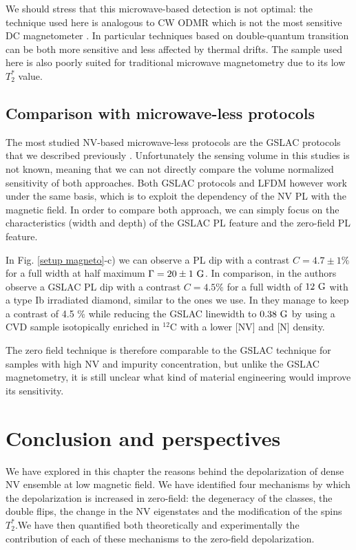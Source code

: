 \documentclass[a4paper, 11pt]{report}
\begin{document}
We should stress that this microwave-based detection is not optimal: the technique used here is analogous to CW ODMR which is not the most sensitive DC magnetometer \citep{barry2020sensitivity}. In particular techniques based on double-quantum transition can be both more sensitive and less affected by thermal drifts. The sample used here is also poorly suited for traditional microwave magnetometry due to its low $T_2^*$ value. 

\subsection{Comparison with microwave-less protocols}
The most studied NV-based microwave-less protocols are the GSLAC protocols that we described previously \citep{wickenbrock2016microwave, zheng2020microwave}. Unfortunately the sensing volume in this studies is not known, meaning that we can not directly compare the volume normalized sensitivity of both approaches. Both GSLAC protocols and LFDM however work under the same basis, which is to exploit the dependency of the NV PL with the magnetic field. In order to compare both approach, we can simply focus on the characteristics (width and depth) of the GSLAC PL feature and the zero-field PL feature.

In Fig. \ref{setup magneto}-c) we can observe a PL dip with a contrast $C=4.7\pm 1 \% $ for a full width at half maximum $\Gamma=20 \pm 1\ \rm G$. In comparison, in \citep{wickenbrock2016microwave} the authors observe a GSLAC PL dip with a contrast $C=4.5 \%$ for a full width of $12 \ \rm G$ with a type Ib irradiated diamond, similar to the ones we use. In \citep{zheng2020microwave} they manage to keep a contrast of 4.5 \% while reducing the GSLAC linewidth to $0.38\ \rm G$ by using a CVD sample isotopically enriched in $^{12}$C with a lower [NV] and [N] density.

The zero field technique is therefore comparable to the GSLAC technique for samples with high NV and impurity concentration, but unlike the GSLAC magnetometry, it is still unclear what kind of material engineering would improve its sensitivity.

\section{Conclusion and perspectives}
We have explored in this chapter the reasons behind the depolarization of dense NV ensemble at low magnetic field. We have identified four mechanisms by which the depolarization is increased in zero-field: the degeneracy of the classes, the double flips, the change in the NV eigenstates and the modification of the spins $T_2^*$.We have then quantified both theoretically and experimentally the contribution of each of these mechanisms to the zero-field depolarization.
\end{document}
